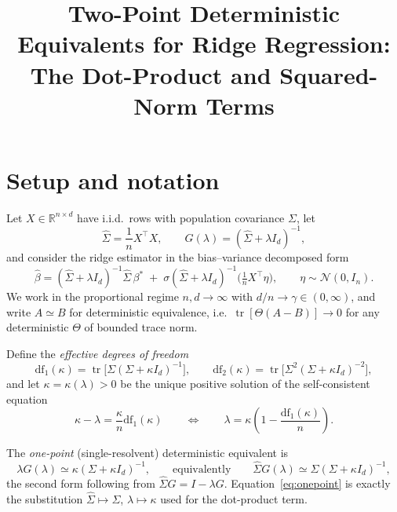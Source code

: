 \documentclass[11pt]{article}
\title{Two-Point Deterministic Equivalents for Ridge Regression:\\
The Dot-Product and Squared-Norm Terms}
\author{}
\date{}
\newcommand{\R}{\mathbb{R}}
\newcommand{\Tr}{\operatorname{tr}}
\newcommand{\Sig}{\Sigma}
\newcommand{\Sighat}{\hat{\Sigma}}
\newcommand{\bstar}{\beta^{*}}
\newcommand{\bhat}{\hat{\beta}}
\newcommand{\Id}{I_{d}}
\newcommand{\Res}{G}                     %
\newcommand{\dfone}{\mathrm{df}_{1}}
\newcommand{\dftwo}{\mathrm{df}_{2}}
\newcommand{\kap}{\kappa}
\newcommand{\Sk}{(\Sig+\kap \Id)}
\newcommand{\deq}{\simeq}                %
\theoremstyle{plain}
\theoremstyle{remark}
\begin{document}
\maketitle

\section{Setup and notation}

Let $X \in \R^{n \times d}$ have i.i.d.\ rows with population covariance $\Sig$, let
\begin{equation}
  \Sighat = \frac{1}{n} X^{\top} X,
  \qquad
  \Res(\lambda) = (\Sighat + \lambda \Id)^{-1},
\end{equation}
and consider the ridge estimator in the bias--variance decomposed form
\begin{equation}
  \label{eq:bhat}
  \bhat
  = (\Sighat + \lambda \Id)^{-1} \Sighat\, \bstar
  \;+\; \sigma (\Sighat + \lambda \Id)^{-1} \Big( \tfrac{1}{n} X^{\top} \eta \Big),
  \qquad \eta \sim \mathcal{N}(0, I_{n}).
\end{equation}
We work in the proportional regime $n, d \to \infty$ with $d/n \to \gamma \in (0,\infty)$,
and write $A \deq B$ for deterministic equivalence, i.e.\ $\Tr[ \Theta (A - B)] \to 0$ for
any deterministic $\Theta$ of bounded trace norm.

Define the \emph{effective degrees of freedom}
\begin{equation}
  \label{eq:df}
  \dfone(\kap) = \Tr\!\big[ \Sig \Sk^{-1} \big],
  \qquad
  \dftwo(\kap) = \Tr\!\big[ \Sig^{2} \Sk^{-2} \big],
\end{equation}
and let $\kap = \kap(\lambda) > 0$ be the unique positive solution of the self-consistent equation
\begin{equation}
  \label{eq:selfconsistent}
  \boxed{\;
  \kap - \lambda = \frac{\kap}{n} \dfone(\kap)
  \qquad \Longleftrightarrow \qquad
  \lambda = \kap \left( 1 - \frac{\dfone(\kap)}{n} \right).
  \;}
\end{equation}

The \emph{one-point} (single-resolvent) deterministic equivalent is
\begin{equation}
  \label{eq:onepoint}
  \lambda \Res(\lambda) \deq \kap \Sk^{-1},
  \qquad \text{equivalently} \qquad
  \Sighat \Res(\lambda) \deq \Sig \Sk^{-1},
\end{equation}
the second form following from $\Sighat \Res = I - \lambda \Res$.
Equation~\eqref{eq:onepoint} is exactly the substitution
$\Sighat \mapsto \Sig$, $\lambda \mapsto \kap$ used for the dot-product term.
\end{document}
